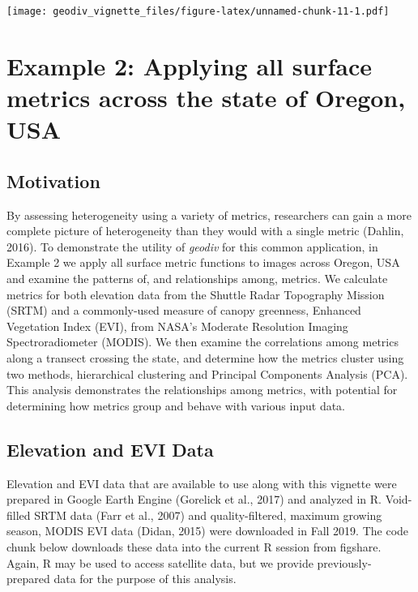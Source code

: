 \documentclass[
]{article}
\begin{document}
\texttt{[image: geodiv\_vignette\_files/figure-latex/unnamed-chunk-11-1.pdf]}

\hypertarget{example-2-applying-all-surface-metrics-across-the-state-of-oregon-usa}{%
\section{Example 2: Applying all surface metrics across the state of
Oregon,
USA}\label{example-2-applying-all-surface-metrics-across-the-state-of-oregon-usa}}

\hypertarget{motivation}{%
\subsection{Motivation}\label{motivation}}

By assessing heterogeneity using a variety of metrics, researchers can
gain a more complete picture of heterogeneity than they would with a
single metric (Dahlin, 2016). To demonstrate the utility of
\emph{geodiv} for this common application, in Example 2 we apply all
surface metric functions to images across Oregon, USA and examine the
patterns of, and relationships among, metrics. We calculate metrics for
both elevation data from the Shuttle Radar Topography Mission (SRTM) and
a commonly-used measure of canopy greenness, Enhanced Vegetation Index
(EVI), from NASA's Moderate Resolution Imaging Spectroradiometer
(MODIS). We then examine the correlations among metrics along a transect
crossing the state, and determine how the metrics cluster using two
methods, hierarchical clustering and Principal Components Analysis
(PCA). This analysis demonstrates the relationships among metrics, with
potential for determining how metrics group and behave with various
input data.

\hypertarget{elevation-and-evi-data}{%
\subsection{Elevation and EVI Data}\label{elevation-and-evi-data}}

Elevation and EVI data that are available to use along with this
vignette were prepared in Google Earth Engine (Gorelick et al., 2017)
and analyzed in R. Void-filled SRTM data (Farr et al., 2007) and
quality-filtered, maximum growing season, MODIS EVI data (Didan, 2015)
were downloaded in Fall 2019. The code chunk below downloads these data
into the current R session from figshare. Again, R may be used to access
satellite data, but we provide previously-prepared data for the purpose
of this analysis.
\end{document}
